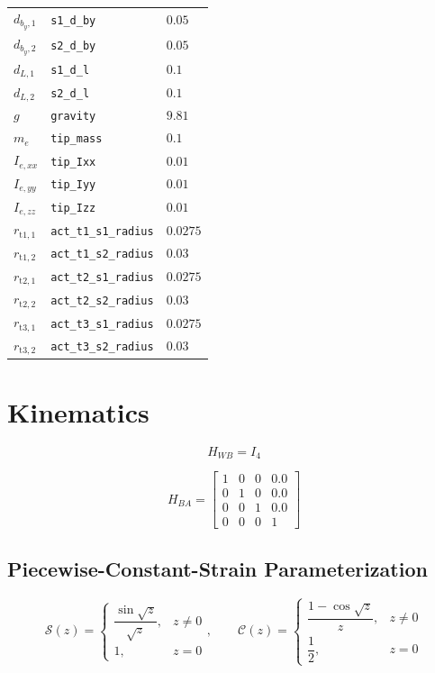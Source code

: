\documentclass[11pt]{article}
\newcommand{\Sfun}{\mathcal{S}}
\newcommand{\Cfun}{\mathcal{C}}
\begin{document}
\begin{longtable}{lll}
$d_{b_y,1}$ & \texttt{s1\_d\_by} & $0.05$ \\
$d_{b_y,2}$ & \texttt{s2\_d\_by} & $0.05$ \\
$d_{L,1}$ & \texttt{s1\_d\_l} & $0.1$ \\
$d_{L,2}$ & \texttt{s2\_d\_l} & $0.1$ \\
$g$ & \texttt{gravity} & $9.81$ \\
$m_e$ & \texttt{tip\_mass} & $0.1$ \\
$I_{e,xx}$ & \texttt{tip\_Ixx} & $0.01$ \\
$I_{e,yy}$ & \texttt{tip\_Iyy} & $0.01$ \\
$I_{e,zz}$ & \texttt{tip\_Izz} & $0.01$ \\
$r_{\mathrm{t1},1}$ & \texttt{act\_t1\_s1\_radius} & $0.0275$ \\
$r_{\mathrm{t1},2}$ & \texttt{act\_t1\_s2\_radius} & $0.03$ \\
$r_{\mathrm{t2},1}$ & \texttt{act\_t2\_s1\_radius} & $0.0275$ \\
$r_{\mathrm{t2},2}$ & \texttt{act\_t2\_s2\_radius} & $0.03$ \\
$r_{\mathrm{t3},1}$ & \texttt{act\_t3\_s1\_radius} & $0.0275$ \\
$r_{\mathrm{t3},2}$ & \texttt{act\_t3\_s2\_radius} & $0.03$ \\
\hline
\end{longtable}

\section{Kinematics}
\begin{equation}
H_{WB}=I_4
\end{equation}

\begin{equation}
H_{BA}=\begin{bmatrix}1 & 0 & 0 & 0.0\\0 & 1 & 0 & 0.0\\0 & 0 & 1 & 0.0\\0 & 0 & 0 & 1\end{bmatrix}\label{eq:mount-transform}
\end{equation}

\subsection{Piecewise-Constant-Strain Parameterization}
\begin{equation}
\Sfun(z)=\begin{cases}\dfrac{\sin\sqrt z}{\sqrt z},&z\ne0\\1,&z=0\end{cases},\qquad \Cfun(z)=\begin{cases}\dfrac{1-\cos\sqrt z}{z},&z\ne0\\\dfrac12,&z=0\end{cases}
\end{equation}
\end{document}
